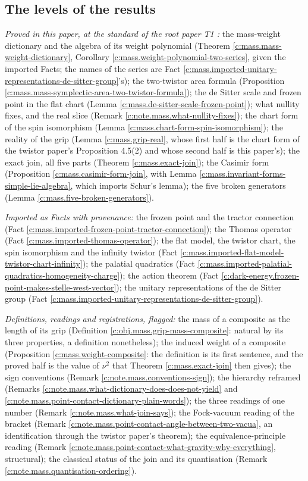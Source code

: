 \documentclass[11pt]{article}
\theoremstyle{definition}
\theoremstyle{plain}
\begin{document}
\subsection*{The levels of the results}
\label{c:note.mass.setting-levels-results}
\emph{Proved in this paper, at the standard of the root paper T1 \cite{ButlerT1}:} the mass-weight dictionary and the algebra of its weight polynomial (Theorem \ref{c:mass.mass-weight-dictionary}, Corollary \ref{c:mass.weight-polynomial-two-series}, given the imported Facts; the names of the series are Fact \ref{c:mass.imported-unitary-representations-de-sitter-group}'s); the two-twistor area formula (Proposition \ref{c:mass.mass-symplectic-area-two-twistor-formula}); the de Sitter scale and frozen point in the flat chart (Lemma \ref{c:mass.de-sitter-scale-frozen-point}); what nullity fixes, and the real slice (Remark \ref{c:note.mass.what-nullity-fixes}); the chart form of the spin isomorphism (Lemma \ref{c:mass.chart-form-spin-isomorphism}); the reality of the grip (Lemma \ref{c:mass.grip-real}, whose first half is the chart form of the twistor paper's Proposition 4.5(2) and whose second half is this paper's); the exact join, all five parts (Theorem \ref{c:mass.exact-join}); the Casimir form (Proposition \ref{c:mass.casimir-form-join}, with Lemma \ref{c:mass.invariant-forms-simple-lie-algebra}, which imports Schur's lemma); the five broken generators (Lemma \ref{c:mass.five-broken-generators}).

\emph{Imported as Facts with provenance:} the frozen point and the tractor connection (Fact \ref{c:mass.imported-frozen-point-tractor-connection}); the Thomas operator (Fact \ref{c:mass.imported-thomas-operator}); the flat model, the twistor chart, the spin isomorphism and the infinity twistor (Fact \ref{c:mass.imported-flat-model-twistor-chart-infinity}); the palatial quadratics (Fact \ref{c:mass.imported-palatial-quadratics-homogeneity-charge}); the action theorem (Fact \ref{c:dark-energy.frozen-point-makes-stelle-west-vector}); the unitary representations of the de Sitter group (Fact \ref{c:mass.imported-unitary-representations-de-sitter-group}).

\emph{Definitions, readings and registrations, flagged:} the mass of a composite as the length of its grip (Definition \ref{c:obj.mass.grip-mass-composite}: natural by its three properties, a definition nonetheless); the induced weight of a composite (Proposition \ref{c:mass.weight-composite}: the definition is its first sentence, and the proved half is the value of $\nu^{2}$ that Theorem \ref{c:mass.exact-join} then gives); the sign conventions (Remark \ref{c:note.mass.conventions-sign}); the hierarchy reframed (Remarks \ref{c:note.mass.what-dictionary-does-does-not-yield} and \ref{c:note.mass.point-contact-dictionary-plain-words}); the three readings of one number (Remark \ref{c:note.mass.what-join-says}); the Fock-vacuum reading of the bracket (Remark \ref{c:note.mass.point-contact-angle-between-two-vacua}, an identification through the twistor paper's theorem); the equivalence-principle reading (Remark \ref{c:note.mass.point-contact-what-gravity-why-everything}, structural); the classical status of the join and its quantisation (Remark \ref{c:note.mass.quantisation-ordering}).
\end{document}
